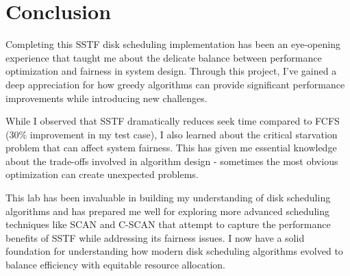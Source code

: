 \documentclass[12pt,a4paper]{article}
\begin{document}
\section{Conclusion}
Completing this SSTF disk scheduling implementation has been an eye-opening experience that taught me about the delicate balance between performance optimization and fairness in system design. Through this project, I've gained a deep appreciation for how greedy algorithms can provide significant performance improvements while introducing new challenges.

While I observed that SSTF dramatically reduces seek time compared to FCFS (30\% improvement in my test case), I also learned about the critical starvation problem that can affect system fairness. This has given me essential knowledge about the trade-offs involved in algorithm design - sometimes the most obvious optimization can create unexpected problems.

This lab has been invaluable in building my understanding of disk scheduling algorithms and has prepared me well for exploring more advanced scheduling techniques like SCAN and C-SCAN that attempt to capture the performance benefits of SSTF while addressing its fairness issues. I now have a solid foundation for understanding how modern disk scheduling algorithms evolved to balance efficiency with equitable resource allocation.
\end{document}
